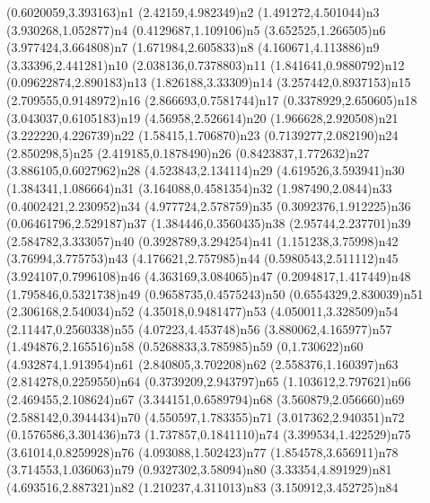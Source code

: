 \pnode(0.6020059,3.393163){n1}
\pnode(2.42159,4.982349){n2}
\pnode(1.491272,4.501044){n3}
\pnode(3.930268,1.052877){n4}
\pnode(0.4129687,1.109106){n5}
\pnode(3.652525,1.266505){n6}
\pnode(3.977424,3.664808){n7}
\pnode(1.671984,2.605833){n8}
\pnode(4.160671,4.113886){n9}
\pnode(3.33396,2.441281){n10}
\pnode(2.038136,0.7378803){n11}
\pnode(1.841641,0.9880792){n12}
\pnode(0.09622874,2.890183){n13}
\pnode(1.826188,3.33309){n14}
\pnode(3.257442,0.8937153){n15}
\pnode(2.709555,0.9148972){n16}
\pnode(2.866693,0.7581744){n17}
\pnode(0.3378929,2.650605){n18}
\pnode(3.043037,0.6105183){n19}
\pnode(4.56958,2.526614){n20}
\pnode(1.966628,2.920508){n21}
\pnode(3.222220,4.226739){n22}
\pnode(1.58415,1.706870){n23}
\pnode(0.7139277,2.082190){n24}
\pnode(2.850298,5){n25}
\pnode(2.419185,0.1878490){n26}
\pnode(0.8423837,1.772632){n27}
\pnode(3.886105,0.6027962){n28}
\pnode(4.523843,2.134114){n29}
\pnode(4.619526,3.593941){n30}
\pnode(1.384341,1.086664){n31}
\pnode(3.164088,0.4581354){n32}
\pnode(1.987490,2.0844){n33}
\pnode(0.4002421,2.230952){n34}
\pnode(4.977724,2.578759){n35}
\pnode(0.3092376,1.912225){n36}
\pnode(0.06461796,2.529187){n37}
\pnode(1.384446,0.3560435){n38}
\pnode(2.95744,2.237701){n39}
\pnode(2.584782,3.333057){n40}
\pnode(0.3928789,3.294254){n41}
\pnode(1.151238,3.75998){n42}
\pnode(3.76994,3.775753){n43}
\pnode(4.176621,2.757985){n44}
\pnode(0.5980543,2.511112){n45}
\pnode(3.924107,0.7996108){n46}
\pnode(4.363169,3.084065){n47}
\pnode(0.2094817,1.417449){n48}
\pnode(1.795846,0.5321738){n49}
\pnode(0.9658735,0.4575243){n50}
\pnode(0.6554329,2.830039){n51}
\pnode(2.306168,2.540034){n52}
\pnode(4.35018,0.9481477){n53}
\pnode(4.050011,3.328509){n54}
\pnode(2.11447,0.2560338){n55}
\pnode(4.07223,4.453748){n56}
\pnode(3.880062,4.165977){n57}
\pnode(1.494876,2.165516){n58}
\pnode(0.5268833,3.785985){n59}
\pnode(0,1.730622){n60}
\pnode(4.932874,1.913954){n61}
\pnode(2.840805,3.702208){n62}
\pnode(2.558376,1.160397){n63}
\pnode(2.814278,0.2259550){n64}
\pnode(0.3739209,2.943797){n65}
\pnode(1.103612,2.797621){n66}
\pnode(2.469455,2.108624){n67}
\pnode(3.344151,0.6589794){n68}
\pnode(3.560879,2.056660){n69}
\pnode(2.588142,0.3944434){n70}
\pnode(4.550597,1.783355){n71}
\pnode(3.017362,2.940351){n72}
\pnode(0.1576586,3.301436){n73}
\pnode(1.737857,0.1841110){n74}
\pnode(3.399534,1.422529){n75}
\pnode(3.61014,0.8259928){n76}
\pnode(4.093088,1.502423){n77}
\pnode(1.854578,3.656911){n78}
\pnode(3.714553,1.036063){n79}
\pnode(0.9327302,3.58094){n80}
\pnode(3.33354,4.891929){n81}
\pnode(4.693516,2.887321){n82}
\pnode(1.210237,4.311013){n83}
\pnode(3.150912,3.452725){n84}

